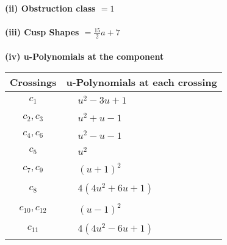 \documentclass[1p]{elsarticle_modified}
\theoremstyle{definition}
\begin{document}
\flushleft \textbf{(ii) Obstruction class $= 1$}\\~\\
\flushleft \textbf{(iii) Cusp Shapes $= \frac{15}{2} a+7$}\\~\\
\newpage\renewcommand{\arraystretch}{1}
\flushleft \textbf{(iv) u-Polynomials at the component}\newline \\
\begin{tabular}{m{50pt}|m{274pt}}
Crossings & \hspace{64pt}u-Polynomials at each crossing \\
\hline $$\begin{aligned}c_{1}\end{aligned}$$&$\begin{aligned}
&u^2-3 u+1
\end{aligned}$\\
\hline $$\begin{aligned}c_{2},c_{3}\end{aligned}$$&$\begin{aligned}
&u^2+u-1
\end{aligned}$\\
\hline $$\begin{aligned}c_{4},c_{6}\end{aligned}$$&$\begin{aligned}
&u^2- u-1
\end{aligned}$\\
\hline $$\begin{aligned}c_{5}\end{aligned}$$&$\begin{aligned}
&u^2
\end{aligned}$\\
\hline $$\begin{aligned}c_{7},c_{9}\end{aligned}$$&$\begin{aligned}
&(u+1)^2
\end{aligned}$\\
\hline $$\begin{aligned}c_{8}\end{aligned}$$&$\begin{aligned}
&4(4 u^2+6 u+1)
\end{aligned}$\\
\hline $$\begin{aligned}c_{10},c_{12}\end{aligned}$$&$\begin{aligned}
&(u-1)^2
\end{aligned}$\\
\hline $$\begin{aligned}c_{11}\end{aligned}$$&$\begin{aligned}
&4(4 u^2-6 u+1)
\end{aligned}$\\
\hline
\end{tabular}\\~\\
\end{document}
